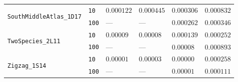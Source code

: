 \documentclass{article}
\begin{document}
\begin{footnotesize}
\begin{tabular}{llllll}
\cline{1-6}
\multirow[c]{2}{*}{\texttt{SouthMiddleAtlas\_1D17}} & \texttt{10} & $0.000122$ & $0.000445$ & $0.000306$ & $0.000832$ \\
 & \texttt{100} & --- & --- & $0.000262$ & $0.000346$ \\
\cline{1-6}
\multirow[c]{2}{*}{\texttt{TwoSpecies\_2L11}} & \texttt{10} & $0.00009$ & $0.00008$ & $0.000139$ & $0.000252$ \\
 & \texttt{100} & --- & --- & $0.00008$ & $0.000893$ \\
\cline{1-6}
\multirow[c]{2}{*}{\texttt{Zigzag\_1S14}} & \texttt{10} & $0.00001$ & $0.00003$ & $0.00000$ & $0.000258$ \\
 & \texttt{100} & --- & --- & $0.00001$ & $0.000111$ \\
\cline{1-6}
\bottomrule
\end{tabular}
\end{footnotesize}
\end{document}
